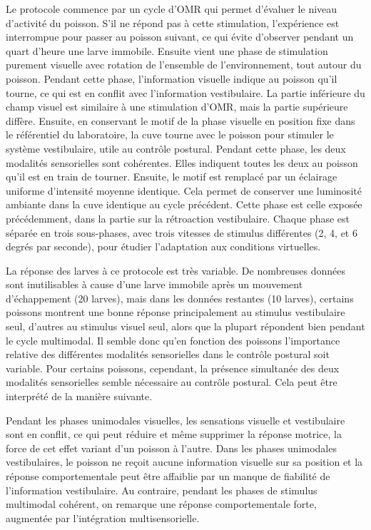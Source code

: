 Le protocole commence par un cycle d'OMR qui permet d'évaluer le niveau d'activité du poisson. S'il ne répond pas à cette stimulation, l'expérience est interrompue pour passer au poisson suivant, ce qui évite d'observer pendant un quart d'heure une larve immobile. Ensuite vient une phase de stimulation purement visuelle avec rotation de l'ensemble de l'environnement, tout autour du poisson. Pendant cette phase, l'information visuelle indique au poisson qu'il tourne, ce qui est en conflit avec l'information vestibulaire. La partie inférieure du champ visuel est similaire à une stimulation d'OMR, mais la partie supérieure diffère. Ensuite, en conservant le motif de la phase visuelle en position fixe dans le référentiel du laboratoire, la cuve tourne avec le poisson pour stimuler le système vestibulaire, utile au contrôle postural. Pendant cette phase, les deux modalités sensorielles sont cohérentes. Elles indiquent toutes les deux au poisson qu'il est en train de tourner. Ensuite, le motif est remplacé par un éclairage uniforme d'intensité moyenne identique. Cela permet de conserver une luminosité ambiante dans la cuve identique au cycle précédent. Cette phase est celle exposée précédemment, dans la partie sur la rétroaction vestibulaire. Chaque phase est séparée en trois sous-phases, avec trois vitesses de stimulus différentes (2, 4, et 6 degrés par seconde), pour étudier l'adaptation aux conditions virtuelles.


La réponse des larves à ce protocole est très variable. De nombreuses données sont inutilisables à cause d'une larve immobile après un mouvement d'échappement (20 larves), mais dans les données restantes (10 larves), certains poissons montrent une bonne réponse principalement au stimulus vestibulaire seul, d'autres au stimulus visuel seul, alors que la plupart répondent bien pendant le cycle multimodal. Il semble donc qu'en fonction des poissons l'importance relative des différentes modalités sensorielles dans le contrôle postural soit variable. Pour certains poissons, cependant, la présence simultanée des deux modalités sensorielles semble nécessaire au contrôle postural. Cela peut être interprété de la manière suivante.

Pendant les phases unimodales visuelles, les sensations visuelle et vestibulaire sont en conflit, ce qui peut réduire et même supprimer la réponse motrice, la force de cet effet variant d'un poisson à l'autre. Dans les phases unimodales vestibulaires, le poisson ne reçoit aucune information visuelle sur sa position et la réponse comportementale peut être affaiblie par un manque de fiabilité de l'information vestibulaire. Au contraire, pendant les phases de stimulus multimodal cohérent, on remarque une réponse comportementale forte, augmentée par l'intégration multisensorielle.

